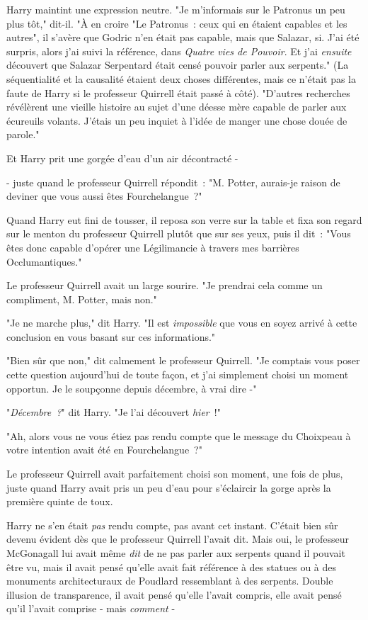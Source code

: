 Harry maintint une expression neutre. "Je m'informais sur le Patronus un peu plus tôt," dit-il. "À en croire "Le Patronus~: ceux qui en étaient capables et les autres", il s'avère que Godric n'en était pas capable, mais que Salazar, si. J'ai été surpris, alors j'ai suivi la référence, dans \emph{Quatre vies de Pouvoir}. Et j'ai \emph{ensuite} découvert que Salazar Serpentard était censé pouvoir parler aux serpents." (La séquentialité et la causalité étaient deux choses différentes, mais ce n'était pas la faute de Harry si le professeur Quirrell était passé à côté). "D'autres recherches révélèrent une vieille histoire au sujet d'une déesse mère capable de parler aux écureuils volants. J'étais un peu inquiet à l'idée de manger une chose douée de parole."

Et Harry prit une gorgée d'eau d'un air décontracté -

- juste quand le professeur Quirrell répondit~: "M. Potter, aurais-je raison de deviner que vous aussi êtes Fourchelangue~?"

Quand Harry eut fini de tousser, il reposa son verre sur la table et fixa son regard sur le menton du professeur Quirrell plutôt que sur ses yeux, puis il dit~: "Vous êtes donc capable d'opérer une Légilimancie à travers mes barrières Occlumantiques."

Le professeur Quirrell avait un large sourire. "Je prendrai cela comme un compliment, M. Potter, mais non."

"Je ne marche plus," dit Harry. "Il est \emph{impossible} que vous en soyez arrivé à cette conclusion en vous basant sur ces informations."

"Bien sûr que non," dit calmement le professeur Quirrell. "Je comptais vous poser cette question aujourd'hui de toute façon, et j'ai simplement choisi un moment opportun. Je le soupçonne depuis décembre, à vrai dire -"

"\emph{Décembre~?}" dit Harry. "Je l'ai découvert \emph{hier}~!"

"Ah, alors vous ne vous étiez pas rendu compte que le message du Choixpeau à votre intention avait été en Fourchelangue~?"

Le professeur Quirrell avait parfaitement choisi son moment, une fois de plus, juste quand Harry avait pris un peu d'eau pour s'éclaircir la gorge après la première quinte de toux.

Harry ne s'en était \emph{pas} rendu compte, pas avant cet instant. C'était bien sûr devenu évident dès que le professeur Quirrell l'avait dit. Mais oui, le professeur McGonagall lui avait même \emph{dit} de ne pas parler aux serpents quand il pouvait être vu, mais il avait pensé qu'elle avait fait référence à des statues ou à des monuments architecturaux de Poudlard ressemblant à des serpents. Double illusion de transparence, il avait pensé qu'elle l'avait compris, elle avait pensé qu'il l'avait comprise - mais \emph{comment} -

